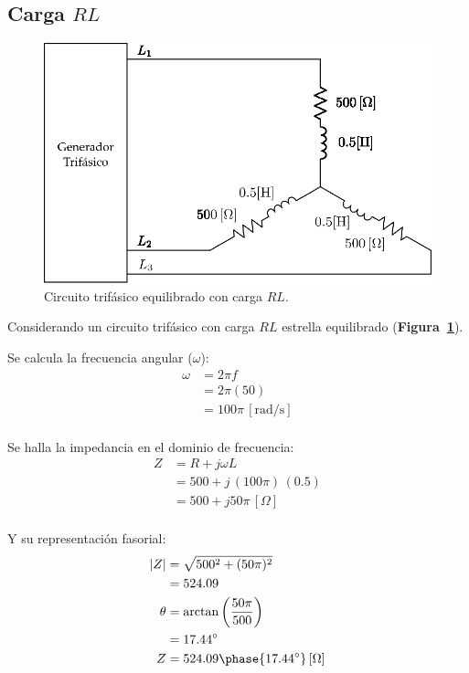 \documentclass[letter,11pt]{article}
\begin{document}
\subsection{Carga $RL$}
\begin{figure}[!h]
\centering
\includegraphics[scale=1]{figura1.eps}
\caption{Circuito trifásico equilibrado con carga $RL$.}
\label{circuito1}
\end{figure}

Considerando un circuito trifásico con carga $RL$ estrella equilibrado
(\textbf{Figura~\ref{circuito1}}).

Se calcula la frecuencia angular ($\omega$):
\begin{equation*}
    \begin{split}
        \omega&=2\pi f\\
              &=2\pi(50)\\
              &=100\pi\,[\text{rad}/\text{s}]\\
    \end{split}
\end{equation*}

Se halla la impedancia en el dominio de frecuencia:
\begin{equation*}
    \begin{split}
        Z &= R+j\omega L\\
          &= 500+j\,(100\pi)\,(0.5)\\
          &= 500+j50\pi\,[\Omega]\\
    \end{split}
\end{equation*}

Y su representación fasorial:
\begin{equation*}
    \begin{split}
        |Z| &= \sqrt{500^2+(50\pi)^2}\\
            &= 524.09\\
        \theta &= \arctan\left(\frac{50\pi}{500}\right)\\
               &= 17.44^{\circ}\\
        Z &= 524.09\phase{17.44^{\circ}}\,[\Omega]\\
    \end{split}
\end{equation*}
\end{document}
